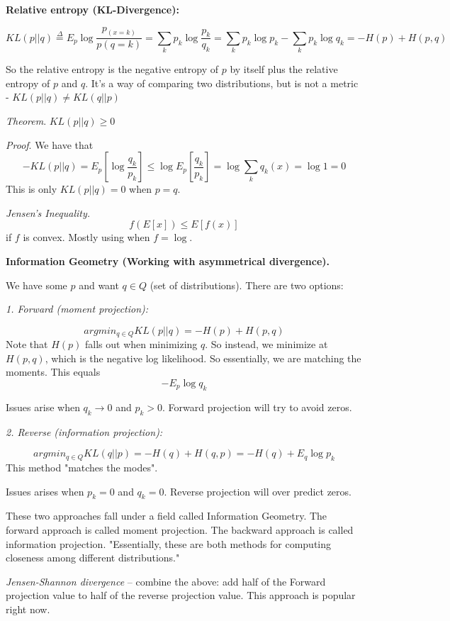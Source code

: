\documentclass{article}
\begin{document}
\smallskip 
\smallskip
\textbf{Relative entropy (KL-Divergence):}

$$KL(p || q) \overset{\Delta}{=} E_p \log \frac{p_(x=k)}{p(q=k)} = \sum_k p_k \log \frac{p_k}{q_k} = \sum_k p_k \log p_k - \sum_k p_k \log q_k = -H(p) + H(p,q)$$

So the relative entropy is the negative entropy of $p$ by itself plus the relative entropy of $p$ and $q$. It's a way of comparing two distributions, but is not a metric - $KL(p || q) \neq KL(q || p)$

\smallskip
\smallskip
\textit{Theorem}. $KL(p||q) \geq 0$

\textit{Proof}. We have that
$$-KL(p||q) = E_p [\log \frac{q_k}{p_k}] \leq \log E_p[ \frac{q_k}{p_k} ] = \log \sum_k q_k(x) = \log 1 = 0$$
This is only $KL(p||q) = 0$ when $p = q$. 

\smallskip
\smallskip
\textit{Jensen's Inequality.}
$$f(E[x]) \leq E[f(x)]$$
if $f$ is convex. Mostly using when $f = \log$. 

\smallskip
\smallskip
\textbf{Information Geometry (Working with asymmetrical divergence).}

We have some $p$ and want $q \in Q$ (set of distributions). There are two options: 

\smallskip
\textit{1. Forward (moment projection):}

$$argmin_{q \in Q} KL(p||q) = -H(p) + H(p,q)$$
Note that $H(p)$ falls out when minimizing $q$. So instead, we minimize at $H(p,q)$, which is the negative log likelihood. So essentially, we are matching the moments. This equals $$-E_p \log q_k$$

\smallskip
Issues arise when $q_k \rightarrow 0$ and $p_k >0$. Forward projection will try to avoid zeros.

\smallskip
\smallskip
\textit{2. Reverse (information projection):}

$$argmin_{q \in Q} KL(q||p) = -H(q) + H(q, p) = -H(q) + E_q \log p_k$$
This method "matches the modes".

\smallskip
Issues arises when $p_k = 0$ and $q_k = 0$. Reverse projection will over predict zeros.

\smallskip
These two approaches fall under a field called Information Geometry.
The forward approach is called moment projection. The backward approach is called information projection. "Essentially, these are both methods for computing closeness among different distributions."

\smallskip
 \textit{Jensen-Shannon divergence} -- combine the above: add half of the Forward projection value to half of the reverse projection value. This approach is popular right now. 
 
\end{document}
